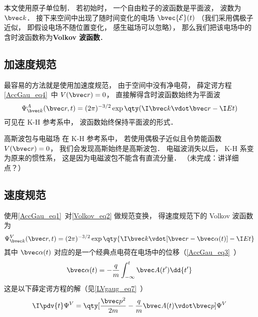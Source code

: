 
\begin{issues}
\issueTODO
\end{issues}


本文使用原子单位制． 若初始时， 一个自由粒子的波函数是平面波， 波数为 $\bvec k$． 接下来空间中出现了随时间变化的电场 $\bvec {\mathcal E}(t)$ （我们采用偶极子近似， 即假设电场不随位置变化， 感生磁场可以忽略）， 那么我们把该电场中的含时波函数称为\textbf{Volkov 波函数}．

\subsection{加速度规范}
最容易的方法就是使用加速度规范， 由于空间中没有净电荷， 薛定谔方程\autoref{AccGau_eq4}~中 $V(\bvec r) = 0$， 直接解得含时波函数始终为平面波
\begin{equation}\label{Volkov_eq2}
\Psi_{\bvec k}^A(\bvec r, t) = (2\pi)^{-3/2} \exp\qty(\I\bvec k \vdot \bvec r - \I Et)
\end{equation}
可见在 K-H 参考系中， 波函数始终保持平面波的形式．

\begin{example}{高斯波包与电磁场}
在 K-H 参考系中， 若使用偶极子近似且令势能函数 $V(\bvec r) = 0$， 我们会发现高斯始终是高斯波包． 电磁波消失以后， K-H 系变为原来的惯性系， 这是因为电磁波包不能含有直流分量． （未完成：讲详细点？）
\end{example}

\subsection{速度规范}
使用\autoref{AccGau_eq1}~对\autoref{Volkov_eq2} 做规范变换， 得速度规范下的 Volkov 波函数为
\begin{equation}\label{Volkov_eq1}
\Psi_{\bvec k}^V(\bvec r, t) = (2\pi)^{-3/2} \exp\qty{\I \bvec k \vdot [\bvec r - \bvec \alpha(t)] - \I Et}
\end{equation}
其中 $\bvec \alpha(t)$ 对应的是一个经典点电荷在电场中的位移（\autoref{AccGau_eq3}~）
\begin{equation}
\bvec \alpha(t) = -\frac{q}{m} \int_{-\infty}^t \bvec A(t') \dd{t'}
\end{equation}
这是以下薛定谔方程的解（见\autoref{LVgaug_eq7}~）
\begin{equation}
\I \pdv{t} \Psi^V = \qty[\frac{\bvec p^2}{2m} - \frac{q}{m}\bvec A(t) \vdot \bvec p] \Psi^V
\end{equation}

